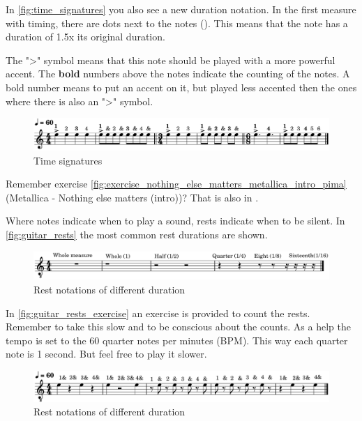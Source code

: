 In \autoref{fig:time_signatures} you also see a new duration notation. In the first measure with  timing, there are dots next to the notes (\quarterNoteDottedDown). This means that the note has a duration of 1.5x its original duration.

The ">" symbol means that this note should be played with a more powerful accent. The \textbf{bold} numbers above the notes indicate the counting of the notes. A bold number means to put an accent on it, but played less accented then the ones where there is also an ">" symbol.

\begin{figure}[h]
	\centering
	\includegraphics[width=\textwidth]{../../MuseScore/Guitar/MusicNotation/TimeSignature.png}
	\caption{Time signatures}
	\label{fig:time_signatures}
\end{figure}

Remember exercise \autoref{fig:exercise_nothing_else_matters_metallica_intro_pima} (Metallica - Nothing else matters (intro))? That is also in .

\newpage

Where notes indicate when to play a sound, rests indicate when to be silent. In \autoref{fig:guitar_rests} the most common rest durations are shown.

\begin{figure}[h]
	\centering
	\includegraphics[width=\textwidth]{../../MuseScore/Guitar/GuitarRests.png}
	\caption{Rest notations of different duration}
	\label{fig:guitar_rests}
\end{figure}

In \autoref{fig:guitar_rests_exercise} an exercise is provided to count the rests. Remember to take this slow and to be conscious about the counts. As a help the tempo is set to the 60 quarter notes per minutes (BPM). This way each quarter note is 1 second. But feel free to play it slower.

\begin{figure}[h]
	\centering
	\includegraphics[width=\textwidth]{../../MuseScore/Guitar/GuitarRestsExercise.png}
	\caption{Rest notations of different duration}
	\label{fig:guitar_rests_exercise}
\end{figure}


